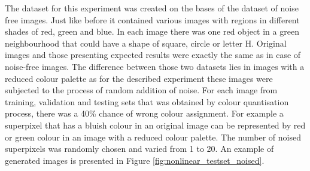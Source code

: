 The dataset for this experiment was created on the bases of the dataset of noise free images. Just like before it contained various images with regions in different shades of red, green and blue. In each image there was one red object in a green neighbourhood that could have a shape of square, circle or letter H. Original images and those presenting expected results were exactly the same as in case of noise-free images. The difference between those two datasets lies in images with a reduced colour palette as for the described experiment these images were subjected to the process of random addition of noise. For each image from training, validation and testing sets that was obtained by colour quantisation process, there was a 40\% chance of wrong colour assignment. For example a superpixel that has a bluish colour in an original image can be represented by red or green colour in an image with a reduced colour palette. The number of noised superpixels was randomly chosen and varied from 1 to 20. An example of generated images is presented in Figure \ref{fig:nonlinear_testset_noised}. 

